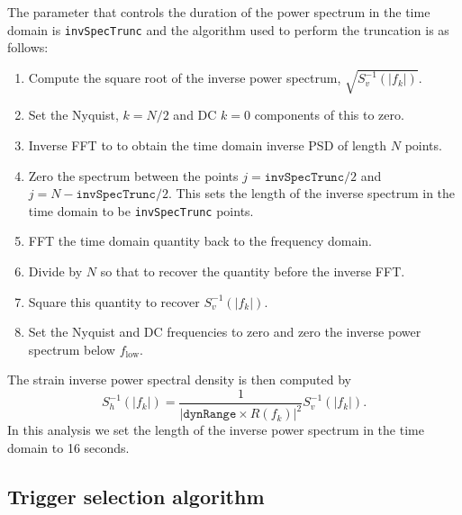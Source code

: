 The parameter that controls the duration of the power spectrum in the time
domain is \texttt{invSpecTrunc} and the algorithm used to perform the
truncation is as follows:
\begin{enumerate}
\item Compute the square root of the inverse power spectrum,
$\sqrt{S^{-1}_v(|f_k|)}$.
\item Set the Nyquist, $k = N/2$ and DC $k = 0$ components of this to zero.
\item Inverse FFT to to obtain the time domain inverse PSD of length $N$
points.
\item Zero the spectrum between the points $j = \mathtt{invSpecTrunc}/2$ and 
$j = N - \mathtt{invSpecTrunc}/2$. This sets the length of the inverse
spectrum in the time domain to be \texttt{invSpecTrunc} points.
\item FFT the time domain quantity back to the frequency domain.
\item Divide by $N$ so that to recover the quantity before the inverse FFT.
\item Square this quantity to recover $S^{-1}_v(|f_k|)$.
\item Set the Nyquist and DC frequencies to zero and zero the inverse power
spectrum below $f_{\mathrm{low}}$.
\end{enumerate}
The strain inverse power spectral density is then computed by
\begin{equation}
S^{-1}_h(|f_k|) = \frac{1}{\left|\mathtt{dynRange} \times R(f_k)\right|^2}
 S^{-1}_v(|f_k|).
\end{equation}
In this analysis we set the length of the inverse power spectrum in the time
domain to 16 seconds.

\subsection{Trigger selection algorithm}
\label{ss:trigger}

